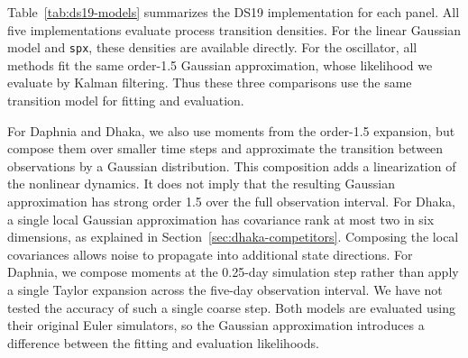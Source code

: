 \documentclass[11pt]{article}
\theoremstyle{thmstylethree}%
\begin{document}
Table~\ref{tab:ds19-models} summarizes the DS19 implementation for each
panel. All five implementations evaluate process transition densities.
For the linear Gaussian model and \texttt{spx}, these
densities are available directly. For the oscillator, all methods fit
the same order-1.5 Gaussian approximation, whose likelihood we evaluate
by Kalman filtering. Thus these three comparisons use the same transition
model for fitting and evaluation.

For Daphnia and Dhaka, we also use moments from the order-1.5 expansion,
but compose them over smaller time steps and approximate the transition
between observations by a Gaussian distribution. This composition adds
a linearization of the nonlinear dynamics. It does not imply that the
resulting Gaussian approximation has strong order 1.5 over the full
observation interval. For Dhaka, a single local Gaussian approximation
has covariance rank at most two in six dimensions, as explained in
Section~\ref{sec:dhaka-competitors}. Composing the local covariances allows
noise to propagate into additional state directions. For Daphnia, we
compose moments at the 0.25-day simulation step rather than apply a
single Taylor expansion across the five-day observation interval.
We have not tested the accuracy of such a single coarse step.
Both models are evaluated using their original Euler simulators, so the
Gaussian approximation introduces a difference between the fitting and
evaluation likelihoods.
\end{document}
